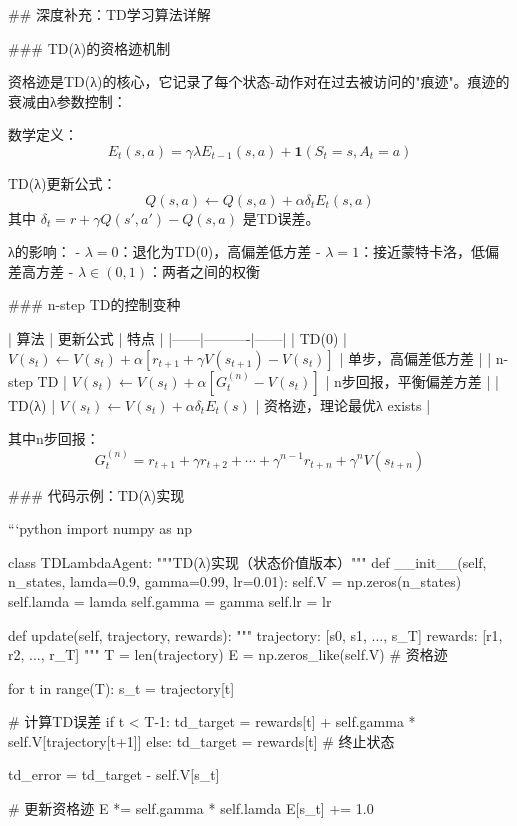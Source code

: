## 深度补充：TD学习算法详解

### TD(λ)的资格迹机制

资格迹是TD(λ)的核心，它记录了每个状态-动作对在过去被访问的"痕迹"。痕迹的衰减由λ参数控制：

数学定义：
$$ E_t(s,a) = \gamma \lambda E_{t-1}(s,a) + \mathbf{1}(S_t=s, A_t=a) $$

TD(λ)更新公式：
$$ Q(s,a) \leftarrow Q(s,a) + \alpha \delta_t E_t(s,a) $$
其中 $\delta_t = r + \gamma Q(s',a') - Q(s,a)$ 是TD误差。

λ的影响：
- $\lambda=0$：退化为TD(0)，高偏差低方差
- $\lambda=1$：接近蒙特卡洛，低偏差高方差  
- $\lambda \in (0,1)$：两者之间的权衡

### n-step TD的控制变种

| 算法 | 更新公式 | 特点 |
|------|----------|------|
| TD(0) | $V(s_t) \leftarrow V(s_t) + \alpha [r_{t+1} + \gamma V(s_{t+1}) - V(s_t)]$ | 单步，高偏差低方差 |
| n-step TD | $V(s_t) \leftarrow V(s_t) + \alpha [G_t^{(n)} - V(s_t)]$ | n步回报，平衡偏差方差 |
| TD(λ) | $V(s_t) \leftarrow V(s_t) + \alpha \delta_t E_t(s)$ | 资格迹，理论最优λ exists |

其中n步回报：
$$ G_t^{(n)} = r_{t+1} + \gamma r_{t+2} + \cdots + \gamma^{n-1} r_{t+n} + \gamma^n V(s_{t+n}) $$

### 代码示例：TD(λ)实现

```python
import numpy as np

class TDLambdaAgent:
    """TD(λ)实现（状态价值版本）"""
    def __init__(self, n_states, lamda=0.9, gamma=0.99, lr=0.01):
        self.V = np.zeros(n_states)
        self.lamda = lamda
        self.gamma = gamma
        self.lr = lr
    
    def update(self, trajectory, rewards):
        """
        trajectory: [s0, s1, ..., s_T]
        rewards: [r1, r2, ..., r_T]
        """
        T = len(trajectory)
        E = np.zeros_like(self.V)  # 资格迹
        
        for t in range(T):
            s_t = trajectory[t]
            
            # 计算TD误差
            if t < T-1:
                td_target = rewards[t] + self.gamma * self.V[trajectory[t+1]]
            else:
                td_target = rewards[t]  # 终止状态
            
            td_error = td_target - self.V[s_t]
            
            # 更新资格迹
            E *= self.gamma * self.lamda
            E[s_t] += 1.0
            
